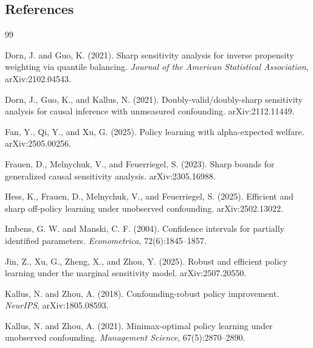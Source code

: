 \documentclass[11pt]{article}
\theoremstyle{definition}
\theoremstyle{plain}
\theoremstyle{remark}
\begin{document}
\subsection*{References}
\begin{thebibliography}{99}

Dorn, J. and Guo, K. (2021).
\newblock Sharp sensitivity analysis for inverse propensity weighting via
quantile balancing.
\newblock \emph{Journal of the American Statistical Association},
arXiv:2102.04543.

Dorn, J., Guo, K., and Kallus, N. (2021).
\newblock Doubly-valid/doubly-sharp sensitivity analysis for causal inference
with unmeasured confounding.
\newblock arXiv:2112.11449.

Fan, Y., Qi, Y., and Xu, G. (2025).
\newblock Policy learning with alpha-expected welfare.
\newblock arXiv:2505.00256.

Frauen, D., Melnychuk, V., and Feuerriegel, S. (2023).
\newblock Sharp bounds for generalized causal sensitivity analysis.
\newblock arXiv:2305.16988.

Hess, K., Frauen, D., Melnychuk, V., and Feuerriegel, S. (2025).
\newblock Efficient and sharp off-policy learning under unobserved confounding.
\newblock arXiv:2502.13022.

Imbens, G. W. and Manski, C. F. (2004).
\newblock Confidence intervals for partially identified parameters.
\newblock \emph{Econometrica}, 72(6):1845--1857.

Jin, Z., Xu, G., Zheng, X., and Zhou, Y. (2025).
\newblock Robust and efficient policy learning under the marginal sensitivity
model.
\newblock arXiv:2507.20550.

Kallus, N. and Zhou, A. (2018).
\newblock Confounding-robust policy improvement.
\newblock \emph{NeurIPS}, arXiv:1805.08593.

Kallus, N. and Zhou, A. (2021).
\newblock Minimax-optimal policy learning under unobserved confounding.
\newblock \emph{Management Science}, 67(5):2870--2890.


\end{thebibliography}
\end{document}
